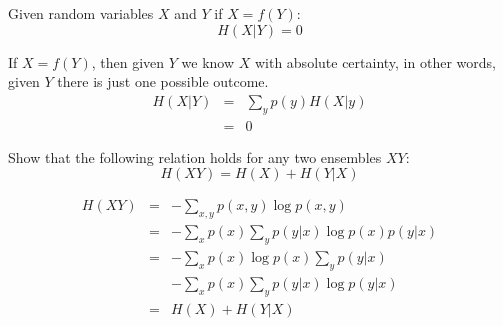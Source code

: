 \begin{exercise}
\label{lem:function}
Given random variables ${X}$ and ${Y}$ if ${X}=f({Y})$: 
\begin{equation*}
H({X}|{Y}) = 0
\end{equation*}
\end{exercise}
\begin{solution}
If ${X}=f({Y})$, then given ${Y}$ we know ${X}$ with absolute certainty, in other words, given ${Y}$ there is just one possible outcome.
\begin{eqnarray}
H({X}|{Y})&=&\sum_{y}p(y) H({X}|y)\nonumber\\
         &=& 0
\end{eqnarray}
\end{solution}


\begin{exercise} Show that the following relation holds for any two ensembles $XY$:
\begin{equation*}
H({XY}) = H({X}) + H({Y}|{X})
\end{equation*}
\end{exercise}
\begin{solution}
\begin{eqnarray}
H({XY}) &=& - \sum_{x,y} p(x,y)\log p(x,y) \nonumber \\
       &=& - \sum_{x}p(x)\sum_{y} p(y|x)\log p(x)p(y|x) \nonumber \\
       &=& - \sum_{x}p(x)\log p(x)\sum_{y} p(y|x) \nonumber \\
       & & - \sum_{x}p(x)\sum_{y} p(y|x)\log p(y|x) \nonumber \\
       &=& H({X}) + H({Y}|{X})
\end{eqnarray}
\end{solution}

